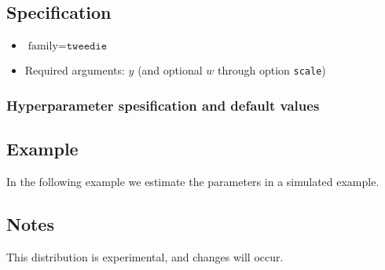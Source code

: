 \documentclass[a4paper,11pt]{article}
\begin{document}
\subsection*{Specification}

\begin{itemize}
\item $\text{family}=\texttt{tweedie}$
\item Required arguments: $y$ (and optional $w$ through option
    \texttt{scale})
\end{itemize}

\subsubsection*{Hyperparameter spesification and default values}


\subsection*{Example}

In the following example we estimate the parameters in a simulated
example.


\subsection*{Notes}

This distribution is experimental, and changes will occur.
\end{document}
